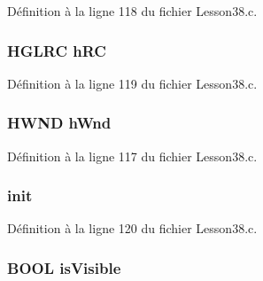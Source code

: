 Définition à la ligne 118 du fichier Lesson38.\+c.

\subsubsection[{\texorpdfstring{h\+RC}{hRC}}]{\setlength{\rightskip}{0pt plus 5cm}H\+G\+L\+RC h\+RC}\hypertarget{struct_g_l___window_a874963259c7cd998acfe6e187fbdb4c1}{}\label{struct_g_l___window_a874963259c7cd998acfe6e187fbdb4c1}


Définition à la ligne 119 du fichier Lesson38.\+c.

\subsubsection[{\texorpdfstring{h\+Wnd}{hWnd}}]{\setlength{\rightskip}{0pt plus 5cm}H\+W\+ND h\+Wnd}\hypertarget{struct_g_l___window_afec4341c234519e145bac6f0e5edaa51}{}\label{struct_g_l___window_afec4341c234519e145bac6f0e5edaa51}


Définition à la ligne 117 du fichier Lesson38.\+c.

\subsubsection[{\texorpdfstring{init}{init}}]{ init}\hypertarget{struct_g_l___window_ab6f3629ef0a0509d5684dcdc796f9351}{}\label{struct_g_l___window_ab6f3629ef0a0509d5684dcdc796f9351}


Définition à la ligne 120 du fichier Lesson38.\+c.

\subsubsection[{\texorpdfstring{is\+Visible}{isVisible}}]{\setlength{\rightskip}{0pt plus 5cm}B\+O\+OL is\+Visible}\hypertarget{struct_g_l___window_aec65890e2f31eaa6ca53c56b5ea79f76}{}\label{struct_g_l___window_aec65890e2f31eaa6ca53c56b5ea79f76}


